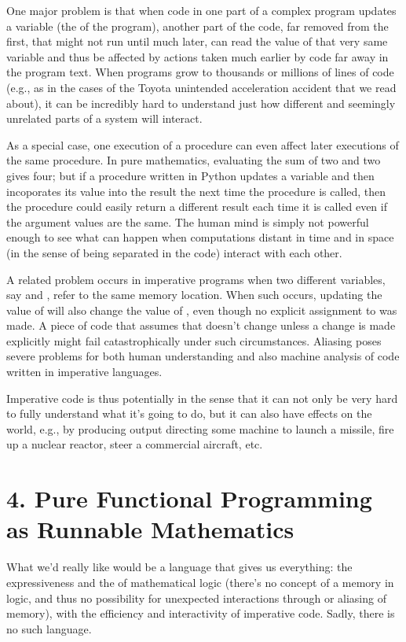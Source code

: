 \documentclass[letterpaper,10pt,english]{sphinxmanual}
\begin{document}
One major problem is that when code in one part of a complex program
updates a variable (the  of the program), another part of the
code, far removed from the first, that might not run until much later,
can read the value of that very same variable and thus be affected by
actions taken much earlier by code far away in the program text. When
programs grow to thousands or millions of lines of code (e.g., as in
the cases of the Toyota unintended acceleration accident that we read
about), it can be incredibly hard to understand just how different and
seemingly unrelated parts of a system will interact.

As a special case, one execution of a procedure can even affect later
executions of the same procedure. In pure mathematics, evaluating the
sum of two and two  gives four; but if a procedure written in
Python updates a  variable and then incoporates its value into
the result the next time the procedure is called, then the procedure
could easily return a different result each time it is called even if
the argument values are the same. The human mind is simply not powerful
enough to see what can happen when computations distant in time and in
space (in the sense of being separated in the code) interact with each
other.

A related problem occurs in imperative programs when two different
variables, say  and , refer to the same memory location. When
such  occurs, updating the value of  will also change the
value of , even though no explicit assignment to  was made. A
piece of code that assumes that  doesn’t change unless a change is
made explicitly might fail catastrophically under such circumstances.
Aliasing poses severe problems for both human understanding and also
machine analysis of code written in imperative languages.

Imperative code is thus potentially  in the sense that it can
not only be very hard to fully understand what it’s going to do, but
it can also have effects on the world, e.g., by producing output
directing some machine to launch a missile, fire up a nuclear reactor,
steer a commercial aircraft, etc.


\chapter{4. Pure Functional Programming as Runnable Mathematics}
\label{\detokenize{04-runnable-math:pure-functional-programming-as-runnable-mathematics}}\label{\detokenize{04-runnable-math::doc}}
What we’d really like would be a language that gives us everything:
the expressiveness and the  of mathematical logic (there’s no
concept of a memory in logic, and thus no possibility for unexpected
interactions through or aliasing of memory), with the efficiency and
interactivity of imperative code. Sadly, there is no such language.
\end{document}
